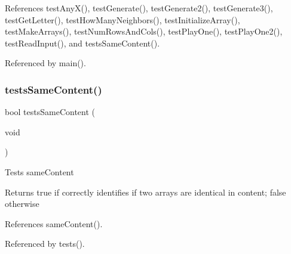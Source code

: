 References test\+Any\+X(), test\+Generate(), test\+Generate2(), test\+Generate3(), test\+Get\+Letter(), test\+How\+Many\+Neighbors(), test\+Initialize\+Array(), test\+Make\+Arrays(), test\+Num\+Rows\+And\+Cols(), test\+Play\+One(), test\+Play\+One2(), test\+Read\+Input(), and tests\+Same\+Content().



Referenced by main().

\mbox{\label{tests_8c_ae10560611501773128dce8c1a36e3e84}} 
\subsubsection{tests\+Same\+Content()}
{\footnotesize\ttfamily bool tests\+Same\+Content (\begin{DoxyParamCaption}\item[{void}]{ }\end{DoxyParamCaption})}

Tests same\+Content \begin{DoxyReturn}{Returns}
true if correctly identifies if two arrays are identical in content; false otherwise 
\end{DoxyReturn}


References same\+Content().



Referenced by tests().

